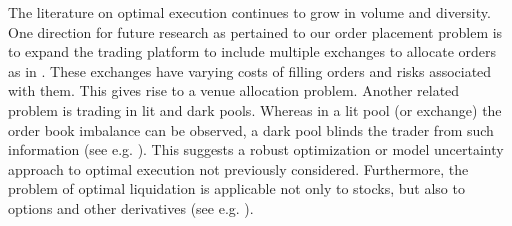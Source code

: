 \documentclass[12pt, letterpaper]{article}
\numberwithin{equation}{section}
\numberwithin{theorem}{section}
\begin{document}
The literature on optimal execution continues to grow in volume and diversity.  One direction  for future research as pertained to our  order placement problem  is  to expand the trading platform to include multiple exchanges to allocate orders as in \cite{arseniythesis}. These exchanges have varying costs of filling orders and risks associated with them. This gives rise to a venue allocation problem. Another related problem is trading in lit and dark pools. Whereas in a lit pool (or exchange) the order book imbalance can be observed, a dark pool blinds the trader from such information (see e.g. \cite{kratzSchoneborn}). This suggests a robust optimization or model uncertainty approach to optimal execution not previously considered. Furthermore,  the problem of  optimal liquidation is applicable not only to stocks, but also to options and other derivatives (see e.g. \cite{LeungLiu2012,LeungShirai2015}). 

\singlespacing

\begin{small}
    
    
\end{small}
\end{document}
